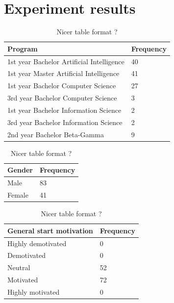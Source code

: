 \documentclass[11pt]{article}
\newcommand{\ra}[1]{\renewcommand{\arraystretch}{#1}}
\begin{document}
\section{Experiment results}

\begin{table}
  \centering
  \ra{1.3}
  \begin{tabular}{@{}ll@{}}
  \toprule
  Program & Frequency \\ 
  \midrule
  1st year Bachelor Artificial Intelligence & 40 \\
  1st year Master Artificial Intelligence & 41 \\
  1st year Bachelor Computer Science & 27 \\
  3rd year Bachelor Computer Science & 3 \\
  1st year Bachelor Information Science & 2 \\
  3rd year Bachelor Information Science & 2 \\
  2nd year Bachelor Beta-Gamma & 9 \\
  \bottomrule
  \end{tabular}
  \caption{Nicer table format ?}
\end{table}

\begin{table}
  \centering
  \ra{1.3}
  \begin{tabular}{@{}ll@{}}
  \toprule
  Gender & Frequency \\
  \midrule
  Male & 83 \\
  Female & 41 \\
  \bottomrule
  \end{tabular}
  \caption{Nicer table format ?}
\end{table}

\begin{table}
  \centering
  \ra{1.3}
  \begin{tabular}{@{}ll@{}}
  \toprule
  General start motivation & Frequency \\ 
  \midrule
  Highly demotivated & 0 \\
  Demotivated & 0 \\
  Neutral & 52 \\
  Motivated & 72 \\
  Highly motivated & 0 \\
  \bottomrule
  \end{tabular}
  \caption{Nicer table format ?}
\end{table}
\end{document}
